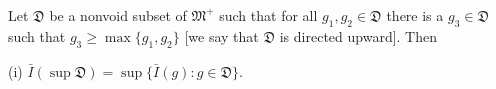 Let $\mathfrak{D}$ be a nonvoid subset of $\mathfrak{M}^+$ such that for all $g_1, g_2 \in \mathfrak{D}$ there is a $g_3 \in \mathfrak{D}$ such that $g_3 \geq \max\{g_1, g_2\}$ [we say that $\mathfrak{D}$ is directed upward]. Then

(i) $\bar{I}(\sup \mathfrak{D}) = \sup\{\bar{I}(g): g \in \mathfrak{D}\}$.